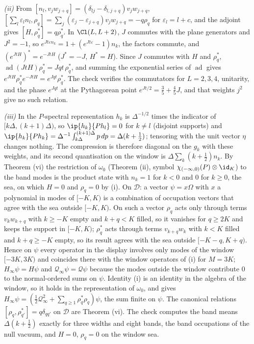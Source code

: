 \emph{(ii)} From $[n_{l}, v_{j}w_{j + q}] = (\delta_{lj} - \delta_{l, j + q})v_{j}w_{j + q}$, $[\sum_{l}\varepsilon_{l}n_{l}, \rho_{q}] = \sum_{j}(\varepsilon_{j} - \varepsilon_{j + q})v_{j}w_{j + q} = -q\rho_{q}$ for $\varepsilon_{l} = l + c$, and the adjoint gives $[H, \rho_{q}^{*}] = q\rho_{q}^{*}$. In $\Cl(L, L + 2)$, $J$ commutes with the plane generators and $J^{2} = -1$, so $e^{Jt\varepsilon n_{k}} = 1 + (e^{Jt\varepsilon} - 1)n_{k}$, the factors commute, and $(e^{JtH})^{*} = e^{-JtH}$ ($J^{*} = -J$, $H^{*} = H$). Since $J$ commutes with $H$ and $\rho_{q}^{*}$, $\operatorname{ad}(JtH)\rho_{q}^{*} = Jqt\,\rho_{q}^{*}$, and summing the exponential series of $\operatorname{ad}$ gives $e^{JtH}\rho_{q}^{*}e^{-JtH} = e^{Jqt}\rho_{q}^{*}$. The check verifies the commutators for $L = 2, 3, 4$, unitarity, and the phase $e^{Jqt}$ at the Pythagorean point $e^{Jt/2} = \tfrac35 + \tfrac45J$, and that weights $j^{2}$ give no such relation.

\emph{(iii)} In the $P$-spectral representation $h_{k}$ is $\Delta^{-1/2}$ times the indicator of $[k\Delta, (k + 1)\Delta)$, so $\ip{h_{k}}{Ph_{l}} = 0$ for $k \ne l$ (disjoint supports) and $\ip{h_{k}}{Ph_{k}} = \Delta^{-1}\int_{k\Delta}^{(k + 1)\Delta}p\,dp = \Delta(k + \tfrac12)$; tensoring with the unit vector $\eta$ changes nothing. The compression is therefore diagonal on the $g_{k}$ with these weights, and its second quantisation on the window is $\Delta\sum_{k}(k + \tfrac12)n_{k}$. By Theorem (vi) the restriction of $\omega_{0}$ (Theorem (ii), symbol $\chi_{(-\infty, 0)}(P)\otimes\id_{K}$) to the band modes is the product state with $n_{k} = 1$ for $k < 0$ and $0$ for $k \ge 0$, the sea, on which $H = 0$ and $\rho_{q} = 0$ by (i). On $\mathcal{D}$: a vector $\psi = x\Omega$ with $x$ a polynomial in modes of $[-K, K)$ is a combination of occupation vectors that agree with the sea outside $[-K, K)$. On such a vector $\rho_{q}$ acts only through terms $v_{k}w_{k + q}$ with $k \ge -K$ empty and $k + q < K$ filled, so it vanishes for $q \ge 2K$ and keeps the support in $[-K, K)$; $\rho_{q}^{*}$ acts through terms $v_{k + q}w_{k}$ with $k < K$ filled and $k + q \ge -K$ empty, so its result agrees with the sea outside $[-K - q, K + q)$. Hence on $\psi$ every operator in the display involves only modes of the window $[-3K, 3K)$ and coincides there with the window operators of (i) for $M = 3K$; $H_{\infty}\psi = H\psi$ and $\mathcal{Q}_{\infty}\psi = \mathcal{Q}\psi$ because the modes outside the window contribute $0$ to the normal-ordered sums on $\psi$. Identity (i) is an identity in the algebra of the window, so it holds in the representation of $\omega_{0}$, and gives $H_{\infty}\psi = (\tfrac12\mathcal{Q}_{\infty}^{2} + \sum_{q \ge 1}\rho_{q}^{*}\rho_{q})\psi$, the sum finite on $\psi$. The canonical relations $[\rho_{q}, \rho_{q'}^{*}] = q\delta_{qq'}$ on $\mathcal{D}$ are Theorem (vi). The check computes the band means $\Delta(k + \tfrac12)$ exactly for three widths and eight bands, the band occupations of the null vacuum, and $H = 0$, $\rho_{q} = 0$ on the window sea.

